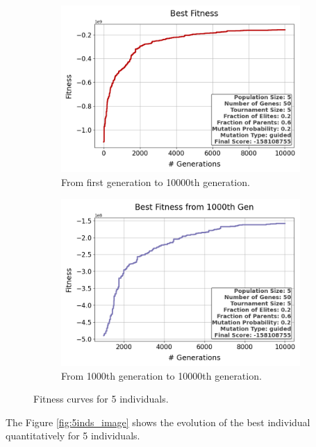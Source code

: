 \documentclass{assignment}
\begin{document}
\begin{figure}[h!]
    \begin{subfigure}{0.5\textwidth}
        \includegraphics[width=\textwidth]{figures/best_fitness_output_5_50_5_0.2_0.6_0.2_guided.png}
        \caption{From first generation to 10000th generation.}
    \end{subfigure}\hfill
    \begin{subfigure}{0.5\textwidth}
        \includegraphics[width=\textwidth]{figures/best_fitness_1000_output_5_50_5_0.2_0.6_0.2_guided.png}
        \caption{From 1000th generation to 10000th generation.}
    \end{subfigure}
    \caption{Fitness curves for 5 individuals.}
\label{fig:5inds}
\end{figure}

The Figure \ref{fig:5inds_image} shows the evolution of the best individual quantitatively for 5 individuals.
\end{document}
